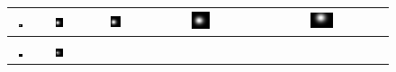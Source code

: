 \documentclass[acmsmall,review,anonymous]{acmart}\settopmatter{printfolios=true,printccs=false,printacmref=false}
\begin{document}
\begin{figure}[!ht]
\setlength\tabcolsep{0.1em}
\begin{tabular}{ccccc}
\includegraphics[width=0.19\textwidth]{images/true-field-t=50} &
\includegraphics[width=0.19\textwidth]{images/true-field-t=641} &
\includegraphics[width=0.19\textwidth]{images/true-field-t=1232} &
\includegraphics[width=0.19\textwidth]{images/true-field-t=3006} &
\includegraphics[width=0.19\textwidth]{images/true-field-t=4089} \\
\hline \\
\includegraphics[width=0.19\textwidth]{images/field-t=50} & 
\includegraphics[width=0.19\textwidth]{images/field-t=641} &

\end{tabular}
\end{figure}
\end{document}
